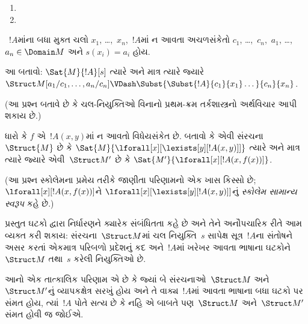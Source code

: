 \begin{prob}
\begin{enumerate}
\item %

\item %
\end{enumerate}
~$!A$માંના બધા મુક્ત ચલો $x_1$, \dots,~$x_n$,~$!A$માં ન
આવતા અચળસંકેતો $c_1$, \dots,~$c_n$,~$a_1$, \dots,
$a_n \in \Domain M$ અને $s(x_i)=a_i$ હોય.

આ બતાવો:
$\Sat{M}{!A}[s]$ ત્યારે અને માત્ર ત્યારે જ્યારે
$\Struct M[a_1/c_1,\dots,a_n/c_n]
\VDash \Subst{\Subst{!A}{c_1}{x_1}\dots}{c_n}{x_n}$.

(આ પ્રશ્ન બતાવે છે કે ચલ-નિયુક્તિઓ વિનાનો પ્રથમ-ક્રમ તર્કશાસ્ત્રનો
અર્થવિચાર આપી શકાય છે.)
\end{prob}

\begin{prob}
ધારો કે $f$ એ~$!A(x,y)$માં ન આવતો વિધેયસંકેત છે. બતાવો કે એવી
સંરચના~$\Struct{M}$ છે કે
$\Sat{M}{\lforall[x][\lexists[y][!A(x,y)]]}$ ત્યારે અને માત્ર ત્યારે
જ્યારે એવી~$\Struct M'$ છે કે
$\Sat{M'}{\lforall[x][!A(x,f(x))]}$.

(આ પ્રશ્ન સ્કોલેમના પ્રમેય તરીકે જાણીતા પરિણામનો એક ખાસ કિસ્સો છે;
$\lforall[x][!A(x,f(x))]$ને
$\lforall[x][\lexists[y][!A(x,y)]]$નું \emph{સ્કોલેમ સામાન્ય સ્વરૂપ}
કહે છે.)
\end{prob}
\endgroup


\begingroup
\makeatletter{}\makeatother


\label{guunit:OLP-0165}


\begin{explain}
પ્રસ્તુત ઘટકો દ્વારા નિર્ધારણને ક્યારેક સંબંધિતતા કહે છે અને તેને
અનૌપચારિક રીતે આમ વ્યક્ત કરી શકાય: સંરચના~$\Struct M$માં
ચલ નિયુક્તિ~$s$ સાપેક્ષ સૂત્ર~$!A$ના સંતોષને અસર કરતાં
એકમાત્ર પરિબળો પ્રદેશનું કદ અને~$!A$માં ખરેખર આવતા ભાષાના ઘટકોને
~$\Struct M$ તથા~$s$ કરેલી નિયુક્તિઓ છે.

આનો એક તાત્કાલિક પરિણામ એ છે કે જ્યાં બે સંરચનાઓ~$\Struct M$
અને~$\Struct M'$નું વ્યાપકક્ષેત્ર સરખું હોય અને તે વાક્ય~$!A$માં આવતા
ભાષાના બધા ઘટકો પર સંમત હોય, ત્યાં~$!A$ પોતે સત્ય છે કે નહિ એ બાબતે
પણ~$\Struct M$ અને~$\Struct M'$ સંમત હોવી જ જોઈએ.
\end{explain}

